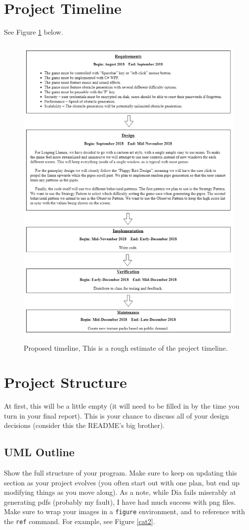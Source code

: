 \documentclass[10pt,conference,onecolumn,compsoc]{IEEEtran}
\begin{document}
\section{Project Timeline}
See Figure \ref{fig:timeline} below.
\begin{figure}[ht!]
\includegraphics[height=600px, width=450px]{ProposalTimeline.png}
\caption{Proposed timeline, This is a rough estimate of the project timeline.}
\label{fig:timeline}
\end{figure}

\section{Project Structure}
At first, this will be a little empty (it will need to be filled in by the time you turn in your final report).  This is your chance to discuss all of your design decisions (consider this the README's big brother).

\subsection{UML Outline}
Show the full structure of your program.  Make sure to keep on updating this section as your project evolves (you often start out with one plan, but end up modifying things as you move along).  As a note, while Dia fails miserably at generating pdfs (probably my fault), I have had much success with png files.  Make sure to wrap your images in a \texttt{figure} environment, and to reference with the \texttt{ref} command.  For example, see Figure \ref{cat2}.
\end{document}
